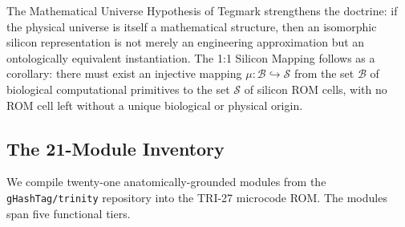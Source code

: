 The Mathematical Universe Hypothesis of Tegmark \cite{tegmark_2008}
strengthens the doctrine: if the physical universe is itself a mathematical
structure, then an isomorphic silicon representation is not merely an
engineering approximation but an ontologically equivalent instantiation.  The
1:1 Silicon Mapping follows as a corollary: there must exist an injective
mapping $\mu : \mathcal{B} \hookrightarrow \mathcal{S}$ from the set
$\mathcal{B}$ of biological computational primitives to the set $\mathcal{S}$
of silicon ROM cells, with no ROM cell left without a unique biological or
physical origin.

\subsection{The 21-Module Inventory}
\label{ssec:flos73-inventory}

We compile twenty-one anatomically-grounded modules from the
\texttt{gHashTag/trinity} repository into the TRI-27 microcode ROM.  The
modules span five functional tiers.

